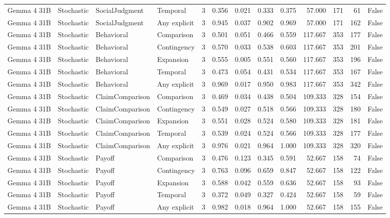 \begin{tabular}{llllrrrrrrrrr}
Gemma 4 31B & Stochastic & SocialJudgment & Temporal & 3 & 0.356 & 0.021 & 0.333 & 0.375 & 57.000 & 171 & 61 & False \\
Gemma 4 31B & Stochastic & SocialJudgment & Any explicit & 3 & 0.945 & 0.037 & 0.902 & 0.969 & 57.000 & 171 & 162 & False \\
Gemma 4 31B & Stochastic & Behavioral & Comparison & 3 & 0.501 & 0.051 & 0.466 & 0.559 & 117.667 & 353 & 177 & False \\
Gemma 4 31B & Stochastic & Behavioral & Contingency & 3 & 0.570 & 0.033 & 0.538 & 0.603 & 117.667 & 353 & 201 & False \\
Gemma 4 31B & Stochastic & Behavioral & Expansion & 3 & 0.555 & 0.005 & 0.551 & 0.560 & 117.667 & 353 & 196 & False \\
Gemma 4 31B & Stochastic & Behavioral & Temporal & 3 & 0.473 & 0.054 & 0.431 & 0.534 & 117.667 & 353 & 167 & False \\
Gemma 4 31B & Stochastic & Behavioral & Any explicit & 3 & 0.969 & 0.017 & 0.950 & 0.983 & 117.667 & 353 & 342 & False \\
Gemma 4 31B & Stochastic & ClaimComparison & Comparison & 3 & 0.469 & 0.034 & 0.438 & 0.504 & 109.333 & 328 & 154 & False \\
Gemma 4 31B & Stochastic & ClaimComparison & Contingency & 3 & 0.549 & 0.027 & 0.518 & 0.566 & 109.333 & 328 & 180 & False \\
Gemma 4 31B & Stochastic & ClaimComparison & Expansion & 3 & 0.551 & 0.028 & 0.524 & 0.580 & 109.333 & 328 & 181 & False \\
Gemma 4 31B & Stochastic & ClaimComparison & Temporal & 3 & 0.539 & 0.024 & 0.524 & 0.566 & 109.333 & 328 & 177 & False \\
Gemma 4 31B & Stochastic & ClaimComparison & Any explicit & 3 & 0.976 & 0.021 & 0.964 & 1.000 & 109.333 & 328 & 320 & False \\
Gemma 4 31B & Stochastic & Payoff & Comparison & 3 & 0.476 & 0.123 & 0.345 & 0.591 & 52.667 & 158 & 74 & False \\
Gemma 4 31B & Stochastic & Payoff & Contingency & 3 & 0.763 & 0.096 & 0.659 & 0.847 & 52.667 & 158 & 122 & False \\
Gemma 4 31B & Stochastic & Payoff & Expansion & 3 & 0.588 & 0.042 & 0.559 & 0.636 & 52.667 & 158 & 93 & False \\
Gemma 4 31B & Stochastic & Payoff & Temporal & 3 & 0.372 & 0.049 & 0.327 & 0.424 & 52.667 & 158 & 59 & False \\
Gemma 4 31B & Stochastic & Payoff & Any explicit & 3 & 0.982 & 0.018 & 0.964 & 1.000 & 52.667 & 158 & 155 & False \\

\end{tabular}
